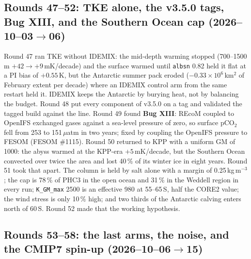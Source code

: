 \documentclass[10pt]{article}
\begin{document}
\subsection{Rounds 47--52: TKE alone, the v3.5.0 tags, Bug XIII, and the Southern Ocean cap
(2026--10--03$\to$06)}\label{sub:tl4752}

Round 47 ran TKE without IDEMIX: the mid-depth warming stopped (700--1500\,m $+42\to+9$\,mK/decade)
and the surface warmed until \texttt{albsn} 0.82 held it flat at a PI bias of $+0.55$\,K, but the
Antarctic summer pack eroded ($-0.33\times10^6$\,km$^2$ of February extent per decade) where an IDEMIX
control arm from the same restart held it. IDEMIX keeps the Antarctic by burying heat, not by
balancing the budget. Round 48 put every component of v3.5.0 on a tag and validated the tagged build
against the line. Round 49 found \textbf{Bug XIII}: REcoM coupled to OpenIFS exchanged gases against a
sea-level pressure of zero, so surface pCO$_2$ fell from 253 to 151\,$\mu$atm in two years; fixed by
coupling the OpenIFS pressure to FESOM (FESOM \#1115). Round 50 returned to KPP with a uniform GM of
1000: the abyss warmed at the KPP-era $+5$\,mK/decade, but the Southern Ocean convected over twice the
area and lost 40\,\% of its winter ice in eight years. Round 51 took that apart. The column is held by
salt alone with a margin of 0.25\,kg\,m$^{-3}$; the cap is 78\,\% of PHC3 in the open ocean and 31\,\%
in the Weddell region in every run; \texttt{K\_GM\_max} 2500 is an effective 980 at 55--65\,S, half the
CORE2 value; the wind stress is only 10\,\% high; and two thirds of the Antarctic calving enters north
of 60\,S. Round 52 made that the working hypothesis.

\subsection{Rounds 53--58: the last arms, the noise, and the CMIP7 spin-up
(2026--10--06$\to$15)}\label{sub:tl5358}
\end{document}
